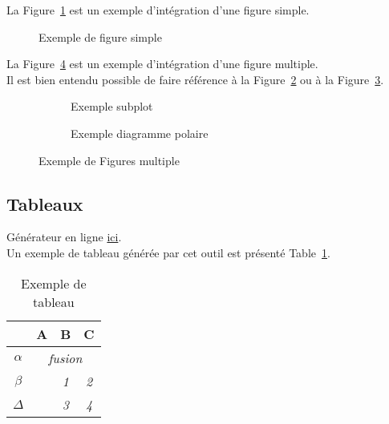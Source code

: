 La Figure~\ref{figure_simple} est un exemple d'intégration d'une figure simple. \\

\begin{figure}[hbtp]
	\centering
	\def\svgwidth{1\columnwidth}
	\fontsize{10pt}{10pt}\selectfont
	\caption{Exemple de figure simple}
	\label{figure_simple}
\end{figure}


La Figure~\ref{figure_multiple} est un exemple d'intégration d'une figure multiple. \\
Il est bien entendu possible de faire référence à la Figure~\ref{figure_subplot} ou à la Figure~\ref{figure_polaire}.

\begin{figure}[hbtp]
	\centering
	\begin{subfigure}[b]{0.8\textwidth}
		\centering
		\def\svgwidth{\columnwidth}
		\fontsize{10pt}{10pt}\selectfont
		\caption{Exemple subplot} 
		\label{figure_subplot}
	\end{subfigure}
	\qquad
	\begin{subfigure}[b]{0.7\textwidth}
		\centering
		\def\svgwidth{\columnwidth}
		\fontsize{10pt}{10pt}\selectfont
		\caption{Exemple diagramme polaire} 
		\label{figure_polaire}
	\end{subfigure}
	\caption{Exemple de Figures multiple} 
	\label{figure_multiple}
\end{figure}



\FloatBarrier
\subsection{Tableaux}

Générateur en ligne \href{http://www.tablesgenerator.com/latex_tables}{ici}. \\

Un exemple de tableau générée par cet outil est présenté Table~\ref{tableau_exemple}.

\begin{table}[]
\centering
\begin{tabular}{c|c|c|c|}
\cline{2-4}
                               & \textbf{A}                 & \textbf{B} & \textbf{C} \\ \hline
\multicolumn{1}{|c|}{$\alpha$} & \multicolumn{3}{c|}{\textit{fusion}}                 \\ \hline
\multicolumn{1}{|c|}{$\beta$}  & \multirow{2}{*}{\textit{}} & \textit{1} & \textit{2} \\ \cline{1-1} \cline{3-4} 
\multicolumn{1}{|c|}{$\Delta$} &                            & \textit{3} & \textit{4} \\ \hline
\end{tabular}
\caption{Exemple de tableau}
\label{tableau_exemple}
\end{table}


